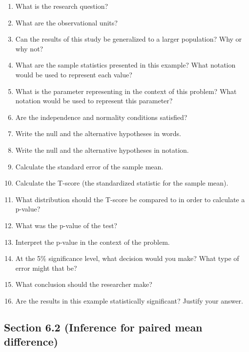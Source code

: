 \documentclass[
]{report}
\newcommand{\rgs}{\vspace{12pt}} %
\begin{document}
\begin{enumerate}
\def\labelenumi{\arabic{enumi}.}
\item
  What is the research question?
  \rgs
\item
  What are the observational units?
  \rgs
\item
  Can the results of this study be generalized to a larger population? Why or why not?
  \rgs
\item
  What are the sample statistics presented in this example? What notation would be used to represent each value?
  \rgs
\item
  What is the parameter representing in the context of this problem? What notation would be used to represent this parameter?
  \rgs
  \rgs
\item
  Are the independence and normality conditions satisfied?
  \rgs
  \rgs
\item
  Write the null and the alternative hypotheses in words.
  \rgs
  \rgs
\item
  Write the null and the alternative hypotheses in notation.
  \rgs
\item
  Calculate the standard error of the sample mean.
  \rgs
  \rgs
\item
  Calculate the T-score (the standardized statistic for the sample mean).
  \rgs
  \rgs
\item
  What distribution should the T-score be compared to in order to calculate a p-value?
  \rgs
\item
  What was the p-value of the test?
  \rgs
\item
  Interpret the p-value in the context of the problem.
  \rgs
  \rgs
\item
  At the 5\% significance level, what decision would you make? What type of error might that be?
  \rgs
\item
  What conclusion should the researcher make?
  \rgs
  \rgs
\item
  Are the results in this example statistically significant? Justify your answer.
  \rgs
\end{enumerate}

\hypertarget{section-6.2-inference-for-paired-mean-difference}{%
\subsection*{Section 6.2 (Inference for paired mean difference)}\label{section-6.2-inference-for-paired-mean-difference}}
\end{document}

